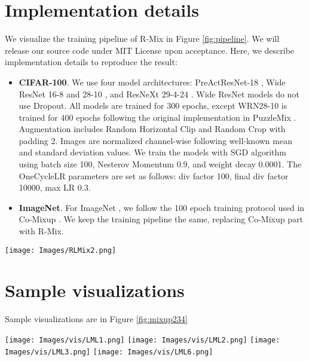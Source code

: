 \documentclass[letterpaper]{article} \usepackage[submission]{aaai23}  \usepackage{times}  \usepackage{helvet}  \usepackage{courier}  \usepackage[hyphens]{url}  \usepackage{graphicx} \urlstyle{rm} \def\UrlFont{\rm}  \usepackage{natbib}  \usepackage{caption} \frenchspacing  \setlength{\pdfpagewidth}{8.5in} \setlength{\pdfpageheight}{11in}
\newcommand{\comixup}{{Co-Mixup}}
\begin{document}
\section*{Implementation details}
We visualize the training pipeline of R-Mix in Figure \ref{fig:pipeline}.  We will release our source code under MIT License upon acceptance. Here, we describe implementation details to reproduce the result:
\begin{itemize}
    \item \textbf{CIFAR-100}. We use four model architectures:
    PreActResNet-18 \cite{he2016preact}, Wide ResNet 16-8 and 28-10 \cite{zagoruyko2017widern}, and ResNeXt 29-4-24 \cite{xie2016resnext}. Wide ResNet models do not use Dropout. All models are trained for 300 epochs, except WRN28-10 is trained for 400 epochs following the original implementation in PuzzleMix \cite{kim2020puzzlemix}. Augmentation includes Random Horizontal Clip and Random Crop with padding 2. Images are normalized channel-wise following well-known mean and standard deviation values.
    We train the models with SGD algorithm using batch size 100, Nesterov Momentum 0.9, and weight decay 0.0001. The OneCycleLR parameters are set as follows: div factor 100, final div factor 10000, max LR 0.3.
    \item \textbf{ImageNet}. For ImageNet \cite{Russakovski2015ImageNet}, we follow the 100 epoch training protocol used in \comixup{} \cite{kim2021comixup}. We keep the training pipeline the same, replacing \comixup{} part with R-Mix.
\end{itemize}


\begin{figure*}[t]
  \centering
  \texttt{[image: Images/RLMix2.png]}
  \caption{Training pipeline of R-Mix. First, it calculates the saliency map, then divies the map into two regions. Next, it mixes the images based on the region the patch belongs to. Finally, it combines the number of patches and mixing ratio to determine the weights of the inputs.}
  \label{fig:pipeline}
\end{figure*}

\section*{Sample visualizations}
Sample visualizations are in Figure \ref{fig:mixup234}
\begin{figure*}[t]
  \centering
  \texttt{[image: Images/vis/LML1.png]}
  \texttt{[image: Images/vis/LML2.png]}
  \texttt{[image: Images/vis/LML3.png]}
  \texttt{[image: Images/vis/LML6.png]}
  \caption{Sample visualization of images produced by R-Mix. }
  \label{fig:mixup234}
\end{figure*}
\end{document}
